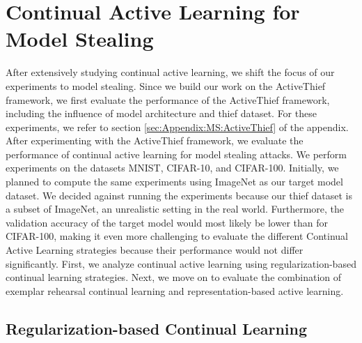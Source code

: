 \section{Continual Active Learning for Model Stealing}
\label{sec:Evaluation:MS}
After extensively studying continual active learning, we shift the focus of our experiments to model stealing. Since we build our work on the ActiveThief framework,
we first evaluate the performance of the ActiveThief framework, including the influence of model architecture and thief dataset. For these experiments, we refer to
section \ref{sec:Appendix:MS:ActiveThief} of the appendix. After experimenting with the ActiveThief framework, we evaluate the performance of continual active learning
for model stealing attacks. We perform experiments on the datasets MNIST, CIFAR-10, and CIFAR-100. Initially, we planned to compute the same experiments using ImageNet
as our target model dataset. We decided against running the experiments because our thief dataset is a subset of ImageNet, an unrealistic setting in 
the real world. Furthermore, the validation accuracy of the target model would most likely be lower than for CIFAR-100, making it even more challenging to
evaluate the different Continual Active Learning strategies because their performance would not differ significantly. First, we analyze continual active
learning using regularization-based continual learning strategies. Next, we move on to evaluate the combination of exemplar rehearsal continual learning and
representation-based active learning. \par


\subsection{Regularization-based Continual Learning}
\label{sec:Evaluation:MS:Regularization}

